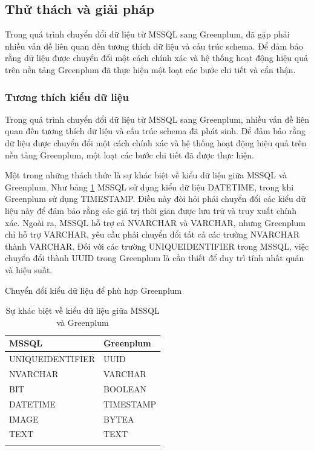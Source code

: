 \documentclass[14pt]{article}
\begin{document}
\subsection{Thử thách và giải pháp}

Trong quá trình chuyển đổi dữ liệu từ MSSQL sang Greenplum, đã gặp phải nhiều vấn đề liên quan đến tương thích dữ liệu và cấu trúc schema. Để đảm bảo rằng dữ liệu được chuyển đổi một cách chính xác và hệ thống hoạt động hiệu quả trên nền tảng Greenplum đã thực hiện một loạt các bước chi tiết và cẩn thận.



\subsubsection{Tương thích kiểu dữ liệu}

Trong quá trình chuyển đổi dữ liệu từ MSSQL sang Greenplum, nhiều vấn đề liên quan đến tương thích dữ liệu và cấu trúc schema đã phát sinh. Để đảm bảo rằng dữ liệu được chuyển đổi một cách chính xác và hệ thống hoạt động hiệu quả trên nền tảng Greenplum, một loạt các bước chi tiết đã được thực hiện.

Một trong những thách thức là sự khác biệt về kiểu dữ liệu giữa MSSQL và Greenplum. Như bảng \ref{tab:tbtype} MSSQL sử dụng kiểu dữ liệu DATETIME, trong khi Greenplum sử dụng TIMESTAMP. Điều này đòi hỏi phải chuyển đổi các kiểu dữ liệu này để đảm bảo rằng các giá trị thời gian được lưu trữ và truy xuất chính xác. Ngoài ra, MSSQL hỗ trợ cả NVARCHAR và VARCHAR, nhưng Greenplum chỉ hỗ trợ VARCHAR, yêu cầu phải chuyển đổi tất cả các trường NVARCHAR thành VARCHAR. Đối với các trường UNIQUEIDENTIFIER trong MSSQL, việc chuyển đổi thành UUID trong Greenplum là cần thiết để duy trì tính nhất quán và hiệu suất.


Chuyển đổi kiểu dữ liệu để phù hợp Greenplum

\begin{longtable}{|p{}|p{}|}
\hline
\textbf{MSSQL} & \textbf{Greenplum} \\ \hline  %
UNIQUEIDENTIFIER & UUID \\ \hline
NVARCHAR & VARCHAR \\ \hline
BIT & BOOLEAN \\ \hline
DATETIME & TIMESTAMP \\ \hline
IMAGE & BYTEA \\ \hline
TEXT & TEXT \\ \hline
\caption{Sự khác biệt về kiểu dữ liệu giữa MSSQL và Greenplum}
\label{tab:tbtype}
\end{longtable}
\end{document}
